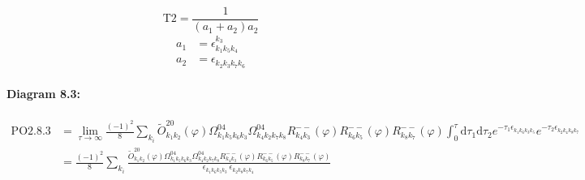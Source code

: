 \documentclass[10pt,a4paper]{article}
\begin{document}
\begin{equation}
\text{T}2 = \frac{1}{(a_1+ a_2)a_2}\end{equation}
\begin{align*}
a_1 &= \epsilon^{k_{3}}_{k_{1}k_{5}k_{4}}\\
a_2 &= \epsilon^{}_{k_{2}k_{3}k_{7}k_{6}}
\end{align*}
\paragraph{Diagram 8.3:}
\begin{align}
\text{PO}2.8.3
&= \lim\limits_{\tau \to \infty}\frac{(-1)^2 }{8}\sum_{k_i}\tilde{O}^{20}_{k_{1}k_{2}} (\varphi) \Omega^{04}_{k_{1}k_{5}k_{6}k_{3}} \Omega^{04}_{k_{4}k_{2}k_{7}k_{8}} R^{--}_{k_{4}k_{3}}(\varphi) R^{--}_{k_{6}k_{5}}(\varphi) R^{--}_{k_{8}k_{7}}(\varphi)\int_{0}^{\tau}\mathrm{d}\tau_1\mathrm{d}\tau_2e^{-\tau_1 \epsilon^{}_{k_{1}k_{6}k_{3}k_{5}}}e^{-\tau_2 \epsilon^{}_{k_{2}k_{4}k_{8}k_{7}}}
 \nonumber \\
&= \frac{(-1)^2 }{8}\sum_{k_i}\frac{\tilde{O}^{20}_{k_{1}k_{2}} (\varphi) \Omega^{04}_{k_{1}k_{5}k_{6}k_{3}} \Omega^{04}_{k_{4}k_{2}k_{7}k_{8}} R^{--}_{k_{4}k_{3}}(\varphi) R^{--}_{k_{6}k_{5}}(\varphi) R^{--}_{k_{8}k_{7}}(\varphi)}{\epsilon^{}_{k_{1}k_{6}k_{5}k_{3}}\ \epsilon^{}_{k_{2}k_{8}k_{7}k_{4}}\ } 
\end{align}
\end{document}
